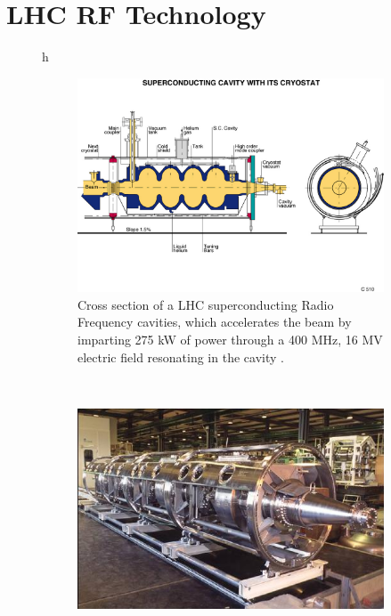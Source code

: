 \section{LHC RF Technology}
\label{lhc_rf_overview}

\begin{figure}{h}
    \centering
    \begin{subfigure}[h]{0.450\textwidth}
        \includegraphics[width=\textwidth]{Figures/LHC_Diagrams/LHC_RFCavity_Schematic-1994-006.jpg}
        \caption{Cross section of a LHC superconducting Radio
          Frequency cavities, which accelerates the beam by imparting
          275 kW of power through a 400 MHz, 16 MV electric field
          resonating in the cavity \cite{Jean-Luc:841461}.}\label{fig:lhc_rf_xs}
      \end{subfigure}
      ~ %
    \begin{subfigure}[h]{0.450\textwidth}
        \includegraphics[width=\textwidth]{Figures/LHC_Diagrams/LHC_RFCavity_Staged.jpg}

\end{subfigure}
\end{figure}
